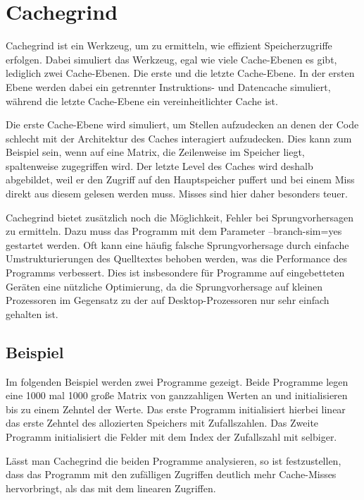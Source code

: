 \section{Cachegrind}
Cachegrind ist ein Werkzeug, um zu ermitteln, wie effizient Speicherzugriffe erfolgen. Dabei simuliert das Werkzeug, egal wie viele Cache-Ebenen es gibt, lediglich zwei Cache-Ebenen. Die erste und die letzte Cache-Ebene. In der ersten Ebene werden dabei ein getrennter Instruktions- und Datencache simuliert, während die letzte Cache-Ebene ein vereinheitlichter Cache ist.

Die erste Cache-Ebene wird simuliert, um Stellen aufzudecken an denen der Code schlecht mit der Architektur des Caches interagiert aufzudecken. Dies kann zum Beispiel sein, wenn auf eine Matrix, die Zeilenweise im Speicher liegt, spaltenweise zugegriffen wird. Der letzte Level des Caches wird deshalb abgebildet, weil er den Zugriff auf den Hauptspeicher puffert und bei einem Miss direkt aus diesem gelesen werden muss. Misses sind hier daher besonders teuer. 

Cachegrind bietet zusätzlich noch die Möglichkeit, Fehler bei Sprungvorhersagen zu ermitteln. Dazu muss das Programm mit dem Parameter --branch-sim=yes gestartet werden. Oft kann eine häufig falsche Sprungvorhersage durch einfache Umstrukturierungen des Quelltextes behoben werden, was die Performance des Programms verbessert. Dies ist insbesondere für Programme auf eingebetteten Geräten eine nützliche Optimierung, da die Sprungvorhersage auf kleinen Prozessoren im Gegensatz zu der auf Desktop-Prozessoren nur sehr einfach gehalten ist.

\subsection{Beispiel}
Im folgenden Beispiel werden zwei Programme gezeigt. Beide Programme legen eine 1000 mal 1000 große Matrix von ganzzahligen Werten an und initialisieren bis zu einem Zehntel der Werte. Das erste Programm initialisiert hierbei linear das erste Zehntel des allozierten Speichers mit Zufallszahlen. Das Zweite Programm initialisiert die Felder mit dem Index der Zufallszahl mit selbiger.

Lässt man Cachegrind die beiden Programme analysieren, so ist festzustellen, dass das Programm mit den zufälligen Zugriffen deutlich mehr Cache-Misses hervorbringt, als das mit dem linearen Zugriffen.
 
